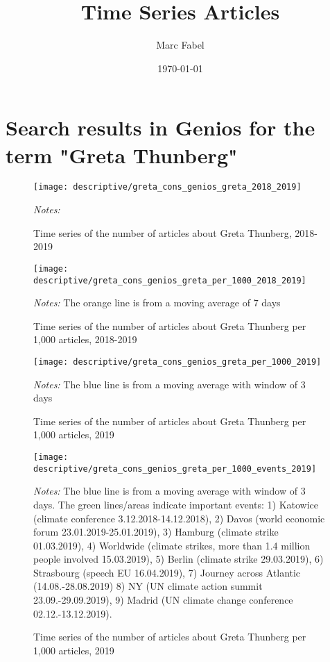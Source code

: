 \documentclass[11pt, a4paper]{article} %
\title{Time Series Articles}
\author{Marc Fabel}
\date{\monthyeardate\today}
\begin{document}
\section{Search results in Genios for the term "Greta Thunberg"}


\begin{figure}[H]\centering
	\caption{Time series of the number of articles about Greta Thunberg, 2018-2019}
	\texttt{[image: descriptive/greta\_cons\_genios\_greta\_2018\_2019]}
	\begin{minipage}{\linewidth}
		\scriptsize{\emph{Notes:} }
	\end{minipage}
\end{figure}
\begin{figure}[H]\centering
	\caption{Time series of the number of articles about Greta Thunberg per 1,000 articles, 2018-2019}
	\texttt{[image: descriptive/greta\_cons\_genios\_greta\_per\_1000\_2018\_2019]}
	\begin{minipage}{\linewidth}
		\scriptsize{\emph{Notes:} The orange line is from a moving average of 7 days}
	\end{minipage}
\end{figure}

\begin{figure}[H]\centering
	\caption{Time series of the number of articles about Greta Thunberg per 1,000 articles, 2019}
	\texttt{[image: descriptive/greta\_cons\_genios\_greta\_per\_1000\_2019]}
	\begin{minipage}{\linewidth}
		\scriptsize{\emph{Notes:} The blue line is from a moving average with window of 3 days}
	\end{minipage}
\end{figure}


\begin{figure}[H]\centering
	\caption{Time series of the number of articles about Greta Thunberg per 1,000 articles, 2019}
	\texttt{[image: descriptive/greta\_cons\_genios\_greta\_per\_1000\_events\_2019]}
	\begin{minipage}{\linewidth}
		\scriptsize{\emph{Notes:} The blue line is from a moving average with window of 3 days. The green lines/areas indicate important events: 1) Katowice (climate conference 3.12.2018-14.12.2018), 2) Davos (world economic forum 23.01.2019-25.01.2019), 3) Hamburg (climate strike 01.03.2019), 4) Worldwide (climate strikes, more than 1.4 million people involved 15.03.2019), 5) Berlin (climate strike 29.03.2019), 6) Strasbourg (speech EU 16.04.2019), 7) Journey across Atlantic (14.08.-28.08.2019) 8) NY (UN climate action summit 23.09.-29.09.2019), 9) Madrid (UN climate change conference 02.12.-13.12.2019).}
	\end{minipage}
\end{figure}
\end{document}

